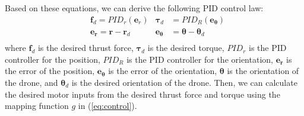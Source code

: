 Based on these equations, we can derive the following PID control law:
\begin{equation}
  \begin{aligned}
    &\bm{f}_d = {PID}_r(\bm{e}_r)
    &\bm{\tau}_d &= {PID}_R(\bm{e_\theta})\\
    &\bm{e_r} = \bm{r} - \bm{r}_d
    &\bm{e_\theta} &= \bm{\theta} - \bm{\theta}_d\\
  \end{aligned}
\end{equation}
where $\bm{f}_d$ is the desired thrust force, 
$\bm{\tau}_d$ is the desired torque, 
$PID_r$ is the PID controller for the position, 
$PID_R$ is the PID controller for the orientation, 
$\bm{e_r}$ is the error of the position, 
$\bm{e_\theta}$ is the error of the orientation, 
$\bm{\theta}$ is the orientation of the drone, 
and $\bm{\theta}_d$ is the desired orientation of the drone.
Then, we can calculate the desired motor inputs from the desired thrust force and torque using the mapping function $g$ in (\ref{eq:control}).
